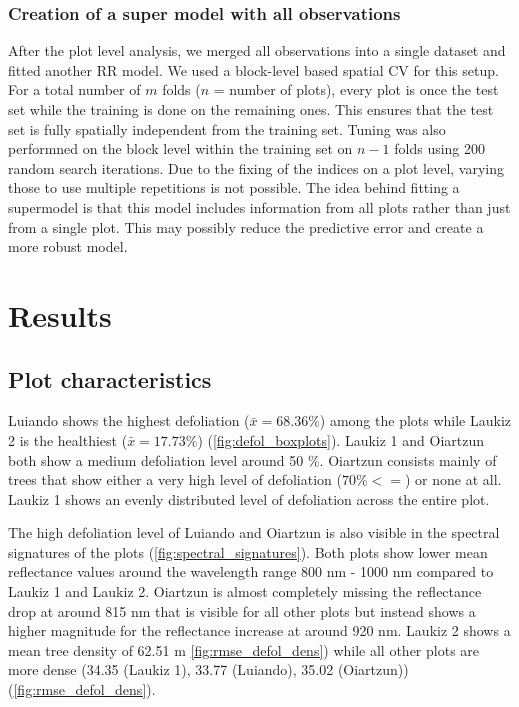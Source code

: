 \documentclass[review]{elsarticle}
\begin{document}
\subsubsection{Creation of a super model with all observations}

After the plot level analysis, we merged all observations into a single dataset and fitted another \ac{RR} model.
We used a block-level based spatial \ac{CV} for this setup.
For a total number of $m$ folds ($n$ = number of plots), every plot is once the test set while the training is done on the remaining ones.
This ensures that the test set is fully spatially independent from the training set.
Tuning was also performned on the block level within the training set on $n - 1$ folds using 200 random search iterations.
Due to the fixing of the indices on a plot level, varying those to use multiple repetitions is not possible.
The idea behind fitting a supermodel is that this model includes information from all plots rather than just from a single plot.
This may possibly reduce the predictive error and create a more robust model.


\section{Results}

\subsection{Plot characteristics}

Luiando shows the highest defoliation ($\bar{x} = 68.36 \%$) among the plots while Laukiz 2 is the healthiest ($\bar{x} = 17.73 \%$) (\autoref{fig:defol_boxplots}).
Laukiz 1 and Oiartzun both show a medium defoliation level around 50 \%.
Oiartzun consists mainly of trees that show either a very high level of defoliation ($70 \% <=$) or none at all.
Laukiz 1 shows an evenly distributed level of defoliation across the entire plot.

The high defoliation level of Luiando and Oiartzun is also visible in the spectral signatures of the plots (\autoref{fig:spectral_signatures}).
Both plots show lower mean reflectance values around the wavelength range 800 nm - 1000 nm compared to Laukiz 1 and Laukiz 2.
Oiartzun is almost completely missing the reflectance drop at around 815 nm that is visible for all other plots but instead shows a higher magnitude for the reflectance increase at around 920 nm.
Laukiz 2 shows a mean tree density of 62.51 m \autoref{fig:rmse_defol_dens}) while all other plots are more dense (34.35 (Laukiz 1), 33.77 (Luiando), 35.02 (Oiartzun)) (\autoref{fig:rmse_defol_dens}).
\end{document}
